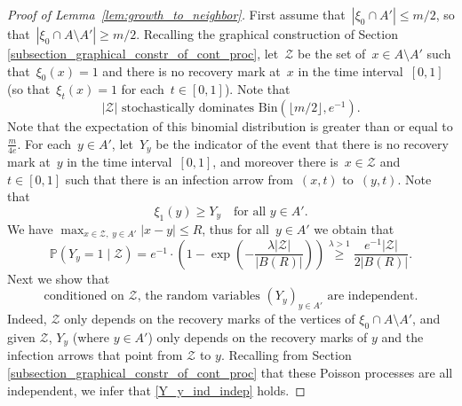 \documentclass[a4paper,12pt]{article}
\begin{document}
\begin{proof}[Proof of Lemma~\ref{lem:growth_to_neighbor}]
First assume that~$|\xi_0 \cap A'  | \leq m/2$, so that~$|\xi_0 \cap A \setminus A' | \geq m/2$. Recalling the graphical construction of Section \ref{subsection_graphical_constr_of_cont_proc}, let~$\mathcal{Z}$ be the set of~$x \in A \setminus A' $ such that~$\xi_0(x) = 1$ and there is no recovery mark at~$x$ in the time interval~$[0,1]$ (so that~$\xi_t(x) = 1$ for each~$t \in [0,1]$). Note that
\begin{equation}\label{eq:first_binomial}
|\mathcal{Z}| \text{ stochastically dominates } \mathrm{Bin}(\lfloor m/2 \rfloor,e^{-1}).
\end{equation}
Note that the expectation of this binomial distribution is greater than or equal to $ \frac{m}{4e}$.
For each~$y \in A'$, let~$Y_{y}$ be the indicator of the event that there is no recovery mark at~$y$ in the time interval~$[0,1]$, and moreover there is~$x \in \mathcal{Z}$ and~$t \in [0,1]$ such that there is an infection arrow from~$(x,t)$ to~$(y,t)$. Note that
\begin{equation}\label{eq:y_above}\xi_1(y) \geq Y_{y}\quad \text{for all } y \in A'.\end{equation}
We have  $\max_{x \in \mathcal{Z},\; y \in A'} |x-y| \leq R$, thus for all~$y \in A'$ we obtain that
\begin{equation}\label{Y_y_ind_parameter_lower_bound}
 \mathbb{P}(Y_{y} = 1 \mid \mathcal{Z}) = e^{-1} \cdot \left(1- \exp\left(-\frac{\lambda |\mathcal{Z}|}{|B(R)|} \right) \right) \stackrel{ \lambda >1 }{\geq}
  \frac{ e^{-1}|\mathcal{Z}|}{2|B(R)|}.
  \end{equation}
Next we show that
\begin{equation}\label{Y_y_ind_indep}
\text{conditioned on~$\mathcal{Z}$, the random variables~$(Y_{y})_{y  \in A'}$ are independent.}
\end{equation}
Indeed,
$\mathcal{Z}$ only depends on the recovery marks of the vertices of $\xi_0 \cap A \setminus A'$, and given $\mathcal{Z}$,  $Y_{y}$ (where $y \in A'$) only depends on the
recovery marks of $y$ and the infection arrows that point from $\mathcal{Z}$ to $y$. Recalling from Section \ref{subsection_graphical_constr_of_cont_proc} that these Poisson processes are all independent, we infer that \eqref{Y_y_ind_indep} holds.


\end{proof}
\end{document}
